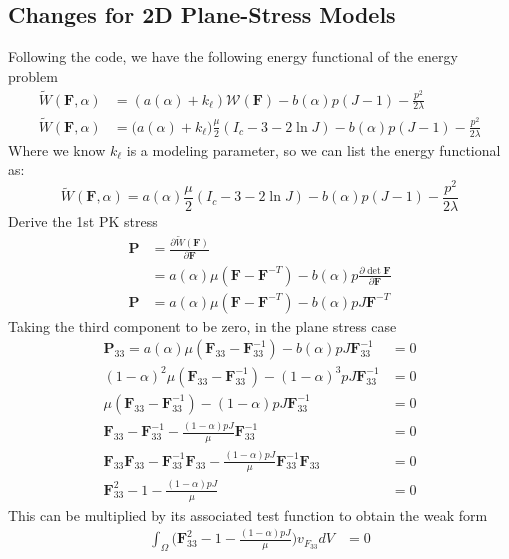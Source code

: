 \documentclass[12pt,3p]{article}
\numberwithin{equation}{section}
\begin{document}
\subsection{Changes for 2D Plane-Stress Models}
Following the code, we have the following energy functional of the energy problem
\begin{align*}
\widetilde{W} (\mathbf{F}, \alpha) &= (a(\alpha) + k_\ell) \mathcal{W} (\mathbf{F}) - b(\alpha) p (J-1) - \frac{p^2}{2 \lambda} \\
\widetilde{W} (\mathbf{F}, \alpha) &= \big( a(\alpha) + k_\ell) \frac{\mu}{2} (I_c - 3 - 2 \ln J) - b(\alpha) p (J-1) - \frac{p^2}{2 \lambda}
\end{align*}
Where we know $k_\ell$ is a modeling parameter, so we can list the energy functional as: 
\begin{equation}
\widetilde{W} (\mathbf{F}, \alpha) = a (\alpha) \frac{\mu}{2} (I_c - 3 - 2 \ln J) - b(\alpha) p (J-1) - \frac{p^2}{2 \lambda} 
\end{equation}
Derive the 1st PK stress
\begin{align*}
\mathbf{P} &= \frac{\partial \widetilde{W} (\mathbf{F})}{\partial \mathbf{F}} \\
		    &= a (\alpha) \mu (\mathbf{F} - \mathbf{F}^{-T}) - b (\alpha) p \frac{\partial \det \mathbf{F}}{\partial \mathbf{F}} \\
\mathbf{P} &= a (\alpha) \mu (\mathbf{F} - \mathbf{F}^{-T}) - b (\alpha) p J \mathbf{F}^{-T}
\end{align*}
Taking the third component to be zero, in the plane stress case
\begin{align*}
\mathbf{P}_{33} = a (\alpha) \mu (\mathbf{F}_{33} - \mathbf{F}^{-1}_{33}) - b (\alpha) p J \mathbf{F}^{-1}_{33} &= 0 \\
(1- \alpha)^2 \mu (\mathbf{F}_{33} - \mathbf{F}^{-1}_{33}) - (1- \alpha)^3 p J \mathbf{F}^{-1}_{33} &= 0 \\
\mu (\mathbf{F}_{33} - \mathbf{F}^{-1}_{33}) - (1- \alpha) p J \mathbf{F}^{-1}_{33} &= 0 \\
\mathbf{F}_{33} - \mathbf{F}^{-1}_{33} - \frac{(1- \alpha) p J}{\mu} \mathbf{F}^{-1}_{33} &= 0 \\
\mathbf{F}_{33} \mathbf{F}_{33} - \mathbf{F}^{-1}_{33} \mathbf{F}_{33} - \frac{(1- \alpha) p J}{\mu} \mathbf{F}^{-1}_{33} \mathbf{F}_{33} &= 0 \\
\mathbf{F}_{33}^2 - 1 - \frac{(1- \alpha) p J}{\mu} &= 0
\end{align*}
This can be multiplied by its associated test function to obtain the weak form 
\begin{align*}
\int_{\Omega} \bigg( \mathbf{F}_{33}^2 - 1 - \frac{(1-\alpha) p J}{\mu} \bigg) v_{F_{33}} dV &= 0
\end{align*}
\end{document}
